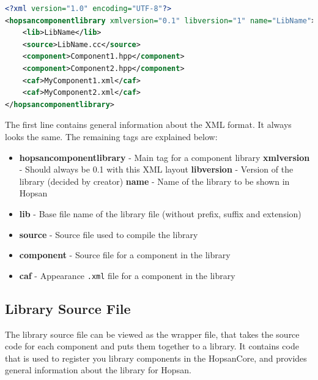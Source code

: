 \documentclass[a4paper,pdftex]{article}
\begin{document}
\begin{minipage}{\linewidth}
\begin{lstlisting}[language=xml, basicstyle=\small\ttfamily]
<?xml version="1.0" encoding="UTF-8"?>
<hopsancomponentlibrary xmlversion="0.1" libversion="1" name="LibName">
    <lib>LibName</lib>
    <source>LibName.cc</source>
    <component>Component1.hpp</component>
    <component>Component2.hpp</component>
    <caf>MyComponent1.xml</caf>
    <caf>MyComponent2.xml</caf>
</hopsancomponentlibrary>
\end{lstlisting}
\end{minipage}

\noindent The first line contains general information about the XML format. It always looks the same. The remaining tags are explained below:

\begin{itemize}
\item \textbf{hopsancomponentlibrary} - Main tag for a component library
\subitem \textbf{xmlversion} - Should always be 0.1 with this XML layout
\subitem \textbf{libversion} - Version of the library (decided by creator)
\subitem \textbf{name} - Name of the library to be shown in Hopsan
\item \textbf{lib} - Base file name of the library file (without prefix, suffix and extension)
\item \textbf{source} - Source file used to compile the library
\item \textbf{component} - Source file for a component in the library
\item \textbf{caf} - Appearance \texttt{.xml} file for a component in the library
\end{itemize}

\subsection*{Library Source File}
The library source file can be viewed as the wrapper file, that takes the source code for each component and puts them together to a library. 
It contains code that is used to register you library components in the HopsanCore, and provides general information about the library for Hopsan.
\end{document}
